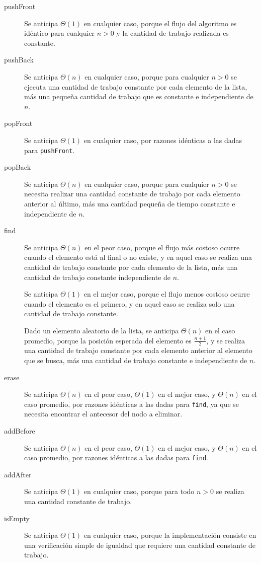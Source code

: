 \begin{description}
	\item[pushFront]{
		Se anticipa $\Theta{} (1)$ en cualquier caso, porque el flujo del algoritmo es idéntico para cualquier $n > 0$ y la cantidad de trabajo realizada es constante.
	}
	\item[pushBack]{
		Se anticipa $\Theta{} (n)$ en cualquier caso, porque para cualquier $n > 0$ se ejecuta una cantidad de trabajo constante por cada elemento de la lista, más una pequeña cantidad de trabajo que es constante e independiente de $n$.
	}
	\item[popFront]{
		Se anticipa $\Theta{} (1)$ en cualquier caso, por razones idénticas a las dadas para \texttt{pushFront}.
	}
	\item[popBack]{
		Se anticipa $\Theta{} (n)$ en cualquier caso, porque para cualquier $n > 0$ se necesita realizar una cantidad constante de trabajo por cada elemento anterior al último, más una cantidad pequeña de tiempo constante e independiente de $n$.
	}
	\item[find]{
		Se anticipa $\Theta{} (n)$ en el peor caso, porque el flujo más costoso ocurre cuando el elemento está al final o no existe, y en aquel caso se realiza una cantidad de trabajo constante por cada elemento de la lista, más una cantidad de trabajo constante independiente de $n$.

		Se anticipa $\Theta{} (1)$ en el mejor caso, porque el flujo menos costoso ocurre cuando el elemento es el primero, y en aquel caso se realiza solo una cantidad de trabajo constante.

		Dado un elemento aleatorio de la lista, se anticipa $\Theta{} (n)$ en el caso promedio, porque la posición esperada del elemento es $\frac{n + 1}{2}$, y se realiza una cantidad de trabajo constante por cada elemento anterior al elemento que se busca, más una cantidad de trabajo constante e independiente de $n$.
	}
	\item[erase]{
		Se anticipa $\Theta{} (n)$ en el peor caso, $\Theta{} (1)$ en el mejor caso, y $\Theta{} (n)$ en el caso promedio, por razones idénticas a las dadas para \texttt{find}, ya que se necesita encontrar el antecesor del nodo a eliminar.
	}
	\item[addBefore]{
		Se anticipa $\Theta{} (n)$ en el peor caso, $\Theta{} (1)$ en el mejor caso, y $\Theta{} (n)$ en el caso promedio, por razones idénticas a las dadas para \texttt{find}.
	}
	\item[addAfter]{
		Se anticipa $\Theta{} (1)$ en cualquier caso, porque para todo $n > 0$ se realiza una cantidad constante de trabajo.
	}
	\item[isEmpty]{
		Se anticipa $\Theta{} (1)$ en cualquier caso, porque la implementación consiste en una verificación simple de igualdad que requiere una cantidad constante de trabajo.
	}
\end{description}

